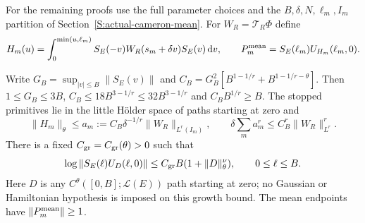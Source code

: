 For the remaining proofs use the full parameter choices and the
$B,\delta,N,\ell_m,I_m$ partition of Section~\ref{S:actual-cameron-mean}. For
$W_R = \mathcal{T}_R\Phi$ define
\[
  H_m(u)=\int_0^{\min(u,\ell_m)}
  S_E(-v)W_R(s_m+\delta v)S_E(v)\,\mathrm{d} v,\qquad
  P_m^{\rm mean}=S_E(\ell_m)U_{H_m}(\ell_m,0).
\]

\begin{lemma}
  \label{L:uniform-product-budgets}
  Write $G_B = \sup_{|v|\le B}\|S_E(v)\|$ and $C_B =
  G_B^2[B^{1-1/r}+B^{1-1/r-\theta}]$. Then $1 \le G_B \le 3B$, $C_B \le
  18B^{3-1/r} \le 32B^{3-1/r}$ and $C_BB^{1/r} \ge B$. The stopped primitives
  lie in the little H\"older space of paths starting at zero and
  \begin{equation}\label{E:uniform-product-primitive}
    \|H_m\|_\theta\le a_m:=C_B\delta^{-1/r}\|W_R\|_{L^r(I_m)},
    \qquad\delta\sum_m a_m^r\le C_B^r\|W_R\|_{L^r}^r .
  \end{equation}
  There is a fixed $C_{\rm gr} = C_{\rm gr}(\theta) > 0$ such that
  \begin{equation}\label{E:uniform-product-growth}
    \log\|S_E(\ell)U_D(\ell,0)\|
    \le C_{\rm gr}B(1+\|D\|_\theta^\nu),\qquad 0\le\ell\le B .
  \end{equation}
  Here $D$ is any $C^\theta([0,B];\mathcal{L}(E))$ path starting at zero; no
  Gaussian or Hamiltonian hypothesis is imposed on this growth bound. The mean
  endpoints have $\|P_m^{\rm mean}\| \ge 1$.
\end{lemma}

